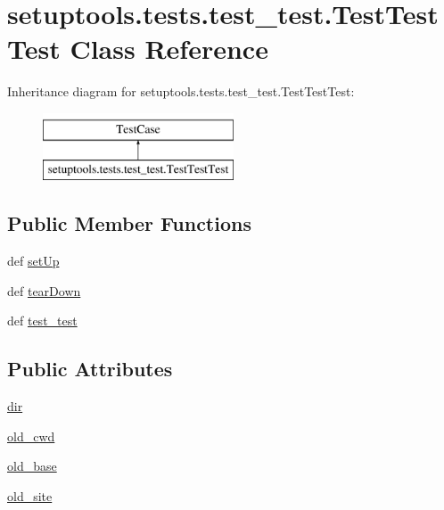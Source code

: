 \hypertarget{classsetuptools_1_1tests_1_1test__test_1_1TestTestTest}{}\section{setuptools.\+tests.\+test\+\_\+test.\+Test\+Test\+Test Class Reference}
\label{classsetuptools_1_1tests_1_1test__test_1_1TestTestTest}
Inheritance diagram for setuptools.\+tests.\+test\+\_\+test.\+Test\+Test\+Test\+:\begin{figure}[H]
\begin{center}
\leavevmode
\includegraphics[height=2.000000cm]{classsetuptools_1_1tests_1_1test__test_1_1TestTestTest}
\end{center}
\end{figure}
\subsection*{Public Member Functions}
\begin{DoxyCompactItemize}
\item 
def \hyperlink{classsetuptools_1_1tests_1_1test__test_1_1TestTestTest_a9127e9dd725d2357803be81ed007c033}{set\+Up}
\item 
def \hyperlink{classsetuptools_1_1tests_1_1test__test_1_1TestTestTest_a7233f4b08197aa89aa17442d7ef560ff}{tear\+Down}
\item 
def \hyperlink{classsetuptools_1_1tests_1_1test__test_1_1TestTestTest_a07db40addd47b128ef4d6d2e3a4df36b}{test\+\_\+test}
\end{DoxyCompactItemize}
\subsection*{Public Attributes}
\begin{DoxyCompactItemize}
\item 
\hyperlink{classsetuptools_1_1tests_1_1test__test_1_1TestTestTest_a8fd8dd87cdeda2cd85ba1969b5b29d84}{dir}
\item 
\hyperlink{classsetuptools_1_1tests_1_1test__test_1_1TestTestTest_a10f270b031d5f4689e9bbbd3546c5319}{old\+\_\+cwd}
\item 
\hyperlink{classsetuptools_1_1tests_1_1test__test_1_1TestTestTest_a3d74778dbd4d47b73a71c8b2af186183}{old\+\_\+base}
\item 
\hyperlink{classsetuptools_1_1tests_1_1test__test_1_1TestTestTest_ae464c55b9d7a0b90db96535f23ca6f12}{old\+\_\+site}
\end{DoxyCompactItemize}


